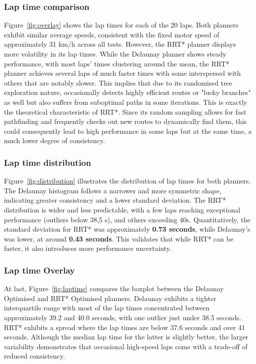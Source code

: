 \documentclass[a4paper,11pt]{report}
\begin{document}
\subsubsection*{Lap time comparison}
Figure~\ref{fig:overlay} shows the lap times for each of the 20 laps. Both planners exhibit similar average speeds, 
consistent with the fixed motor speed of approximately 31 km/h across all tests. However, the RRT* planner 
displays more volatility in its lap times. While the
Delaunay planner shows steady performance, with most laps’ times clustering around the mean, the RRT* planner
achieves several laps of much faster times with some interspersed
with others that are notably slower. This 
implies that due to its randomised tree exploration
nature, occasionally detects highly efficient routes
or "lucky branches" as well but also suffers from
suboptimal paths in some iterations.
This is exactly the theoretical characteristic of RRT*. Since its random sampling allows for
fast pathfinding and frequently checks out new routes to dynamically find them,
this could consequently lead to high performance in some laps
but at the same time, a much lower degree of consistency.

\subsubsection*{Lap time distribution}
Figure~\ref{fig:distribution} illustrates the distribution of lap times for both planners. 
The Delaunay histogram follows a narrower and more symmetric shape, indicating greater consistency and a lower 
standard deviation. The RRT* distribution is wider and less predictable, with a few laps reaching exceptional 
performance (outliers below 38,5 s), and others exceeding 40s. Quantitatively, the standard deviation for RRT* was approximately 
\textbf{0.73 seconds}, while Delaunay's was lower, at around \textbf{0.43 seconds}. This validates that while RRT* can be faster, 
it also introduces more performance uncertainty.

\subsubsection*{Lap time Overlay}
At last, Figure~\ref{fig:laptime} compares the boxplot between the Delaunay Optimised and RRT* Optimised planners. 
Delaunay exhibits a tighter interquartile range with most of the lap times concentrated between approximately 39.2 and 40.0 seconds, 
with one outlier just under 38.5 seconds. RRT* exhibits a spread where the lap times are below 37.6 seconds and over 41 seconds. 
Although the median lap time for the latter is slightly better, the larger variability demonstrates that occasional high-speed laps come with 
a trade-off of reduced consistency.
\end{document}
